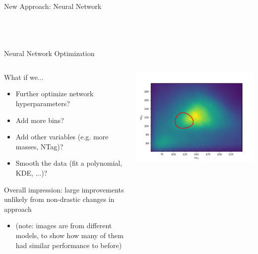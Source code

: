 \documentclass[10pt, aspectratio=169]{beamer}
\begin{document}
{\begin{frame}{New Approach: Neural Network}
\begin{columns}[onlytextwidth]
\begin{column}{0.4\textwidth}
    \end{column}
​  \end{columns}
\end{frame}
}

\begin{frame}{Neural Network Optimization}
  \begin{columns}[onlytextwidth]
    \begin{column}{0.6\textwidth}
      What if we...
      \begin{itemize}
        \item Further optimize network hyperparameters?
        \item Add more bins?
        \item Add other variables (e.g. more masses, NTag)?
        \item Smooth the data (fit a polynomial, KDE, ...)?
      \end{itemize}
      Overall impression: large improvements unlikely from non-drastic changes in approach
      \begin{itemize}
        \item (note: images are from different models, to show how many of them had similar performance to before)
      \end{itemize}
    \end{column}
    \begin{column}{0.4\textwidth}
      \includegraphics[width=\linewidth]{images/model_20_288_384_416_512_192_30e_25x25_poisson_fullmassplane_4bNN.png}\\

\end{column}
\end{columns}
\end{frame}
\end{document}
